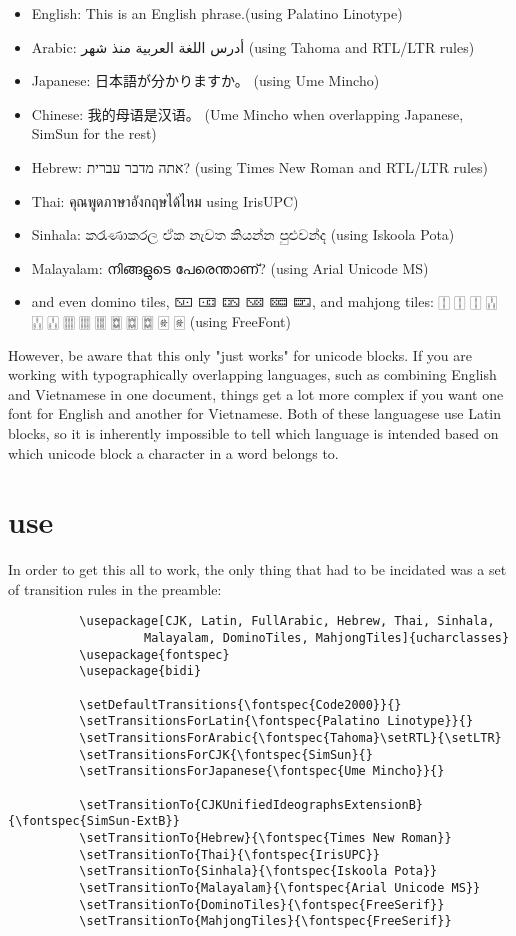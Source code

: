 ﻿\documentclass{article}
\newenvironment{itemlist}{%
  \begin{itemize}
	\setlength{\itemsep}{0pt}
	\setlength{\parsep}{0pt}
	\setlength{\topsep}{0pt}
	\setlength{\partopsep}{0pt}
	\setlength{\parskip}{0pt}
	\setlength{\labelsep}{5pt}}%
{
  \end{itemize}}
\begin{document}
		\begin{itemlist}
			\item English: This is an English phrase.(using Palatino Linotype)
			\item Arabic: أدرس اللغة العربية منذ شهر (using Tahoma and RTL/LTR rules)
			\item Japanese: 日本語が分かりますか。 (using Ume Mincho)
			\item Chinese: 我的母语是汉语。 (Ume Mincho when overlapping Japanese, SimSun for the rest)
			\item Hebrew: אתה מדבר עברית? (using Times New Roman and RTL/LTR rules)
			\item Thai: คุณพูดภาษาอังกฤษได้ไหม using IrisUPC)
			\item Sinhala: කරැණාකරල ඒක නැවත කියන්න පුළුවන්ද (using Iskoola Pota)
			\item Malayalam: നിങ്ങളുടെ പേരെന്താണ്? (using Arial Unicode MS)
			\item and even domino tiles, 🁇 🀼 🁐 🁋 🁚 🁝, and mahjong tiles: 🀑 🀑 🀑 🀒 🀒 🀒 🀕 🀕 🀕 🀗 🀗 🀗 🀅 🀅 (using FreeFont)
		\end{itemlist}

		However, be aware that this only "just works" for unicode blocks. If you are working with typographically overlapping languages, such as combining English and Vietnamese in one document, things get a lot more complex if you want one font for English and another for Vietnamese. Both of these languagese use Latin blocks, so it is inherently impossible to tell which language is intended based on which unicode block a character in a word belongs to.
		
	\section{use}

		In order to get this all to work, the only thing that had to be incidated was a set of transition rules in the preamble:
		
		\disableTransitionRules
		\begin{verbatim}
　　　　　　\usepackage[CJK, Latin, FullArabic, Hebrew, Thai, Sinhala,
                   Malayalam, DominoTiles, MahjongTiles]{ucharclasses}
　　　　　　\usepackage{fontspec}
　　　　　　\usepackage{bidi}

　　　　　　\setDefaultTransitions{\fontspec{Code2000}}{}
　　　　　　\setTransitionsForLatin{\fontspec{Palatino Linotype}}{}
　　　　　　\setTransitionsForArabic{\fontspec{Tahoma}\setRTL}{\setLTR}
　　　　　　\setTransitionsForCJK{\fontspec{SimSun}{}
　　　　　　\setTransitionsForJapanese{\fontspec{Ume Mincho}}{}

　　　　　　\setTransitionTo{CJKUnifiedIdeographsExtensionB}{\fontspec{SimSun-ExtB}}
　　　　　　\setTransitionTo{Hebrew}{\fontspec{Times New Roman}}
　　　　　　\setTransitionTo{Thai}{\fontspec{IrisUPC}}
　　　　　　\setTransitionTo{Sinhala}{\fontspec{Iskoola Pota}}
　　　　　　\setTransitionTo{Malayalam}{\fontspec{Arial Unicode MS}}
　　　　　　\setTransitionTo{DominoTiles}{\fontspec{FreeSerif}}
　　　　　　\setTransitionTo{MahjongTiles}{\fontspec{FreeSerif}}
		\end{verbatim}
		\enableTransitionRules
\end{document}
